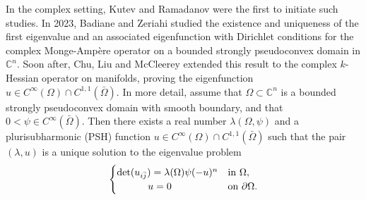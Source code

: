 \documentclass[11pt]{amsart}
\numberwithin{theorem}{section}
\numberwithin{equation}{section}
\begin{document}
In the complex setting, Kutev and Ramadanov \cite{Kutev-Ramadanov1989,Kutev-Ramadanov1990} were the first to initiate such studies. In 2023, Badiane and Zeriahi \cite{Badiane-Zeriahi2023} studied the existence and uniqueness of the first eigenvalue and an associated eigenfunction with Dirichlet conditions for the complex Monge-Amp\`{e}re operator on a bounded strongly pseudoconvex domain in $\mathbb{C}^n$. Soon after, Chu, Liu and McCleerey \cite{Chu-Liu-McCleerey-arXiv2024} extended this result to the complex $k$-Hessian operator on manifolds, proving the eigenfunction $u\in C^\infty(\Omega)\cap C^{1,1}(\bar{\Omega})$. In more detail, assume that $\Omega\subset\mathbb{C}^n$ is a bounded strongly pseudoconvex domain with smooth boundary, and that $0<\psi\in C^\infty(\bar{\Omega})$. Then there exists a real number $\lambda(\Omega,\psi)$ and a plurisubharmonic (PSH) function $u\in C^\infty(\Omega)\cap C^{1,1}(\bar{\Omega})$ such that the pair $(\lambda,u)$ is a unique solution to the eigenvalue problem
\begin{equation}\label{Equation-Dirichletproblem}
\begin{cases}
\det(u_{i\bar{j}})=\lambda(\Omega)\psi(-u)^n & \mathrm{in}\ \Omega,\\
\hspace{11mm}u=0 & \mathrm{on} \ \partial\Omega.
\end{cases}
\end{equation}
\end{document}

